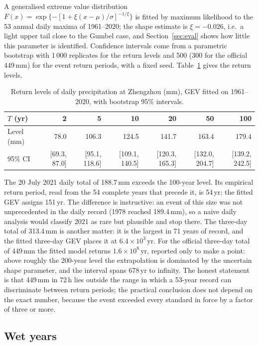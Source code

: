 A generalised extreme value distribution $F(x)=\exp\{-[1+\xi(x-\mu)/\sigma]^{-1/\xi}\}$ \cite{coles2001} is fitted by maximum likelihood to the 53 annual daily maxima of 1961--2020; the shape estimate is $\xi=-0.026$, i.e.\ a light upper tail close to the Gumbel case, and Section~\ref{sec:eval} shows how little this parameter is identified. Confidence intervals come from a parametric bootstrap with 1\,000 replicates for the return levels and 500 (300 for the official 449\,mm) for the event return periods, with a fixed seed. Table~\ref{tab:q1rl} gives the return levels.

\begin{table}[H]
\centering
\caption{Return levels of daily precipitation at Zhengzhou (mm), GEV fitted on 1961--2020, with bootstrap 95\% intervals.}
\label{tab:q1rl}
\footnotesize
\setlength{\tabcolsep}{3pt}
\begin{tabular}{lrrrrrr}
\toprule
$T$ (yr) & 2 & 5 & 10 & 20 & 50 & 100\\
\midrule
Level (mm) & 78.0 & 106.3 & 124.5 & 141.7 & 163.4 & 179.4\\
95\% CI & [69.3, 87.0] & [95.1, 118.6] & [109.1, 140.5] & [120.3, 165.3] & [132.0, 204.7] & [139.2, 242.5]\\
\bottomrule
\end{tabular}
\end{table}

The 20 July 2021 daily total of 188.7\,mm exceeds the 100-year level. Its empirical return period, read from the 54 complete years that precede it, is 54\,yr; the fitted GEV assigns 151\,yr. The difference is instructive: an event of this size was not unprecedented in the daily record (1978 reached 189.4\,mm), so a naive daily analysis would classify 2021 as rare but plausible and stop there. The three-day total of 313.4\,mm is another matter: it is the largest in 71 years of record, and the fitted three-day GEV places it at $6.4\times10^{3}$\,yr. For the official three-day total of 449\,mm the fitted model returns $1.6\times10^{8}$\,yr, reported only to make a point: above roughly the 200-year level the extrapolation is dominated by the uncertain shape parameter, and the interval spans 678\,yr to infinity. The honest statement is that 449\,mm in 72\,h lies outside the range in which a 53-year record can discriminate between return periods; the practical conclusion does not depend on the exact number, because the event exceeded every standard in force by a factor of three or more.

\subsection{Wet years}

